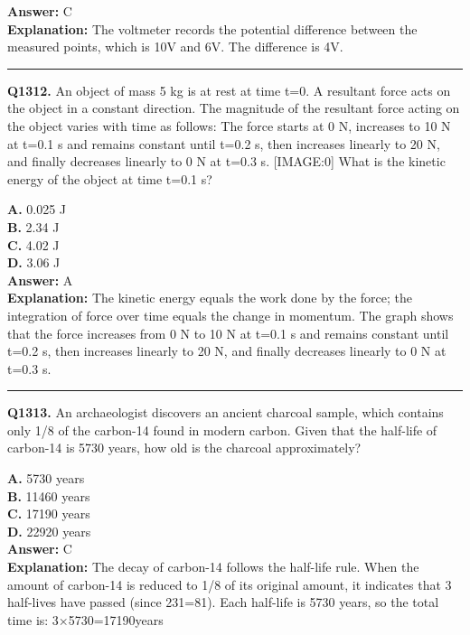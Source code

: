 \documentclass[12pt]{article}
\begin{document}
\textbf{Answer:} C \\
\textbf{Explanation:} The voltmeter records the potential difference between the measured points, which is 10V and 6V. The difference is 4V.

\hrule
\vspace{1em}


\noindent
\textbf{Q1312.} An object of mass 5 kg is at rest at time t=0. A resultant force acts on the object in a constant direction. The magnitude of the resultant force acting on the object varies with time as follows:
The force starts at 0 N, increases to 10 N at t=0.1 s and remains constant until t=0.2 s, then increases linearly to 20 N, and finally decreases linearly to 0 N at t=0.3 s.
[IMAGE:0]
What is the kinetic energy of the object at time t=0.1 s?



\textbf{A.} 0.025 J \\
\textbf{B.} 2.34 J \\
\textbf{C.} 4.02 J \\
\textbf{D.} 3.06 J \\

\textbf{Answer:} A \\
\textbf{Explanation:} The kinetic energy equals the work done by the force; the integration of force over time equals the change in momentum. The graph shows that the force increases from 0 N to 10 N at t=0.1 s and remains constant until t=0.2 s, then increases linearly to 20 N, and finally decreases linearly to 0 N at t=0.3 s.

\hrule
\vspace{1em}


\noindent
\textbf{Q1313.} An archaeologist discovers an ancient charcoal sample, which contains only 1/8 of the carbon-14 found in modern carbon. Given that the half-life of carbon-14 is 5730 years, how old is the charcoal approximately?



\textbf{A.} 5730 years \\
\textbf{B.} 11460 years \\
\textbf{C.} 17190 years \\
\textbf{D.} 22920 years \\

\textbf{Answer:} C \\
\textbf{Explanation:} The decay of carbon-14 follows the half-life rule. When the amount of carbon-14 is reduced to 1/8 of its original amount, it indicates that 3 half-lives have passed (since 231​=81​). Each half-life is 5730 years, so the total time is:
3×5730=17190years
\end{document}
